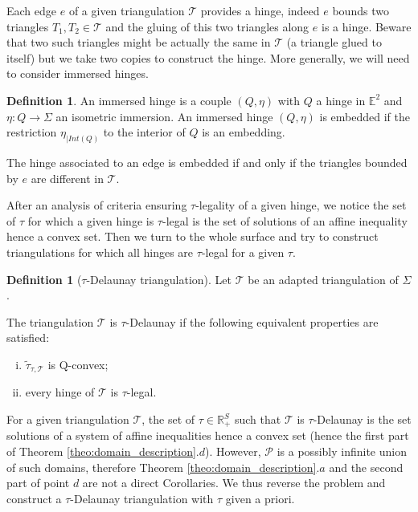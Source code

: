\documentclass[a4paper,12pt]{article}
\def\TT{\mathcal T}
\def\E{\mathbf E}
\def\adm{\P}
\def\E{\mathbb{E}}
\def\RR{\mathbb{R}}
\def\E{\mathbb{E}}
\def\adm{\mathcal{P}}
\def\P{\mathcal{P}}
\newcommand{\tautilde}[2]{\widetilde\tau_{#1,#2}}
\theoremstyle{definition}
\newtheorem{defi}[lem]{Definition}	%
\begin{document}
					Each edge $e$ of a given triangulation $\TT$ provides a hinge, indeed $e$ bounds two triangles $T_1,T_2\in \TT$ and the gluing of this two triangles along $e$ is a hinge. Beware that two such triangles might be actually the same in $\TT$ (a triangle glued to itself) but we take two copies to construct the hinge. More generally, we will need to consider immersed hinges.
					\begin{defi}\label{defi:immersed_hinge} An immersed hinge is a couple $(Q,\eta)$ with $Q$ a hinge  in $\E^2$ and $\eta: Q \rightarrow \Sigma$ an isometric
						immersion.		
						An immersed hinge $(Q,\eta)$ is embedded if the restriction  $\eta_{|Int(Q)}$ to the interior of $Q$ is an embedding.
					\end{defi}
					The hinge associated to an edge is embedded if and only if the triangles bounded by $e$ are different in $\TT$. 
					
					After an analysis of criteria ensuring $\tau$-legality of a given hinge, we notice the set of $\tau$ for which a given hinge is $\tau$-legal is the set of solutions of an affine inequality hence a convex set. Then we turn to the whole surface and try to construct triangulations for which all hinges are $\tau$-legal for a given $\tau$. 
					
					\begin{defi}[$\tau$-Delaunay triangulation]
						Let $\TT$ be an adapted triangulation of $\Sigma$.

						The triangulation $\TT$ is $\tau$-Delaunay if the following equivalent properties are satisfied:
						\begin{enumerate}[(i)]
							\item $\tautilde{\tau}{\TT}$ is Q-convex;
							\item every hinge of $\TT$ is $\tau$-legal.
						\end{enumerate}
					\end{defi}
					For a given triangulation $\TT$, the set of $\tau\in\RR_ +^S$ such that $\TT$ is $\tau$-Delaunay is the set solutions of a system of affine inequalities hence a convex set (hence the first part of Theorem \ref{theo:domain_description}.$d$). However, $\adm$ is a possibly infinite union of such domains, therefore Theorem \ref{theo:domain_description}.$a$ and the second part of  point $d$ are not a direct Corollaries. We thus reverse the problem and construct a $\tau$-Delaunay triangulation with $\tau$ given a priori.
					
\end{document}
